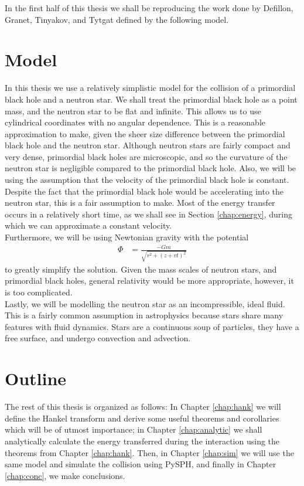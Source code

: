 In the first half of this thesis we shall be reproducing the work done by Defillon, Granet, Tinyakov, and Tytgat \cite{tidalcapture} defined by the following model.

\section{Model}

In this thesis we use a relatively simplistic model \cite{tidalcapture} for the collision of a primordial black hole and a neutron star. We shall treat the primordial black hole as a point mass, and the neutron star to be flat and infinite. This allows us to use cylindrical coordinates with no angular dependence. This is a reasonable approximation to make, given the sheer size difference between the primordial black hole and the neutron star. Although neutron stars are fairly compact and very dense, primordial black holes are microscopic, and so the curvature of the neutron star is negligible compared to the primordial black hole. Also, we will be using the assumption that the velocity of the primordial black hole is constant. Despite the fact that the primordial black hole would be accelerating into the neutron star, this is a fair assumption to make. Most of the energy transfer occurs in a relatively short time, as we shall see in Section \ref{chap:energy}, during which we can approximate a constant velocity. \\

Furthermore, we will be using Newtonian gravity with the potential
\begin{align}
\label{eq:gravity}
\Phi &= \frac{-Gm}{\sqrt{r^2 + (z + vt)^2}}
\end{align}
to greatly simplify the solution. Given the mass scales of neutron stars, and primordial black holes, general relativity would be more appropriate, however, it is too complicated. \\

Lastly, we will be modelling the neutron star as an incompressible, ideal fluid. This is a fairly common assumption in astrophysics because stars share many features with fluid dynamics. Stars are a continuous soup of particles, they have a free surface, and undergo convection and advection.

\section{Outline}

The rest of this thesis is organized as follows: In Chapter \ref{chap:hank} we will define the Hankel transform and derive some useful theorems and corollaries which will be of utmost importance; in Chapter \ref{chap:analytic} we shall analytically calculate the energy transferred during the interaction using the theorems from Chapter \ref{chap:hank}. Then, in Chapter \ref{chap:sim} we will use the same model and simulate the collision using PySPH, and finally in Chapter \ref{chap:conc}, we make conclusions.


%
